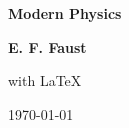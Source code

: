 \documentclass[../../../main.tex]{subfiles}
\begin{document}
\begin{titlepage}
    \begin{center}
        \vspace*{0.5cm}
        
        \Huge
        \textbf{Modern Physics}
    
        \vspace{1.5cm}
        \Large
        \textbf{E. F. Faust} 

        \vspace{0.2cm}
        \large with \LaTeX
        
        \vfill
        \begin{figure}[h!]
            \centering
        \end{figure}
        \vfill
        \Large
        {\today}
        
    \end{center}
\end{titlepage}
\end{document}
